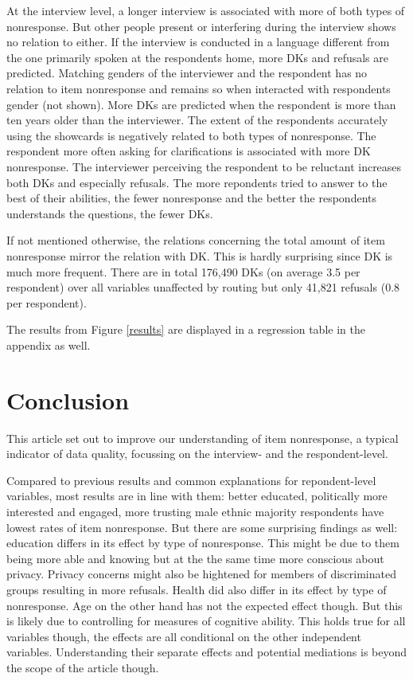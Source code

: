 \documentclass[a4paper,12pt]{article}
\begin{document}
At the interview level, a longer interview is associated with more of both types of nonresponse. But other people present or interfering during the interview shows no relation to either. If the interview is conducted in a language different from the one primarily spoken at the respondents home, more DKs and refusals are predicted. Matching genders of the interviewer and the respondent has no relation to item nonresponse and remains so when interacted with respondents gender (not shown). More DKs are predicted when the respondent is more than ten years older than the interviewer. The extent of the respondents accurately using the showcards is negatively related to both types of nonresponse. The respondent more often asking for clarifications is associated with more DK nonresponse. The interviewer perceiving the respondent to be reluctant increases both DKs and especially refusals. The more repondents tried to answer to the best of their abilities, the fewer nonresponse and the better the respondents understands the questions, the fewer DKs.

If not mentioned otherwise, the relations concerning the total amount of item nonresponse mirror the relation with DK. This is hardly surprising since DK is much more frequent. There are in total 176,490 DKs (on average 3.5 per respondent) over all variables unaffected by routing but only 41,821 refusals (0.8 per respondent).

The results from Figure \ref{results} are displayed in a regression table in the appendix as well.


\section{Conclusion}

This article set out to improve our understanding of item nonresponse, a typical indicator of data quality, focussing on the interview- and the respondent-level. 

Compared to previous results and common explanations for repondent-level variables, most results are in line with them: better educated, politically more interested and engaged, more trusting male ethnic majority respondents have lowest rates of item nonresponse. But there are some surprising findings as well: education differs in its effect by type of nonresponse. This might be due to them being more able and knowing but at the the same time more conscious about privacy. Privacy concerns might also be hightened for members of discriminated groups resulting in more refusals. Health did also differ in its effect by type of nonresponse. Age on the other hand has not the expected effect though. But this is likely due to controlling for measures of cognitive ability. This holds true for all variables though, the effects are all conditional on the other independent variables. Understanding their separate effects and potential mediations is beyond the scope of the article though.
\end{document}
